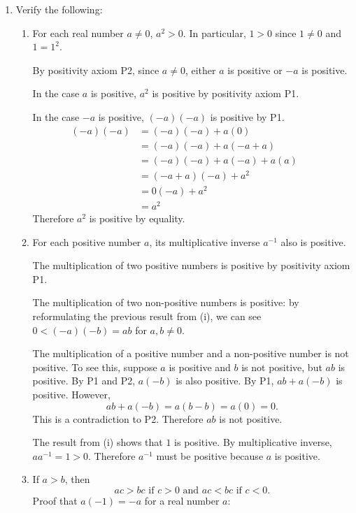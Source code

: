 \begin{enumerate}
	\item Verify the following:
	\begin{enumerate}[label=(\roman*),align=left]
        \item For each real number $a\neq 0$, $a^2>0$. In particular, $1>0$ since $1 \neq 0$ and $1=1^2$.\par
        By positivity axiom P2, since $a\neq 0$, either $a$ is positive or $-a$ is positive.\par
		In the case $a$ is positive, $a^2$ is positive by positivity axiom P1.\par
		In the case $-a$ is positive, $(-a)(-a)$ is positive by P1.
		\begin{align*}
			(-a)(-a) & = (-a)(-a) + a(0) && \tag*{by additive identity}\\
			& = (-a)(-a) + a(-a+a) && \tag*{by additive inverse}\\
			& = (-a)(-a) + a(-a) + a(a) && \tag*{by distributive property} \\
			& = (-a + a)(-a) + a^2 && \tag*{by distributive property} \\
			& = 0(-a) + a^2 &&\tag*{by additive inverse} \\
			& = a^2 &&\tag*{by additive identity}
		\end{align*}
		Therefore $a^2$ is positive by equality.
        \item For each positive number $a$, its multiplicative inverse  $a^{-1}$ also is positive.\par
        The multiplication of two positive numbers is positive by positivity axiom P1.\par
		The multiplication of two non-positive numbers is positive: by reformulating the previous result from (i), we can see $0 < (-a)(-b) = ab$ for $a,b \neq 0$. \par
		The multiplication of a positive number and a non-positive number is not positive. 
		To see this, suppose $a$ is positive and $b$ is not positive, but $ab$ is positive. By P1 and P2, $a(-b)$ is also positive.
		By P1, $ab + a(-b)$ is positive. However,
		\[
		ab + a(-b) = a(b-b) = a(0) = 0.
		\]
		This is a contradiction to P2. Therefore $ab$ is not positive.
		\par
		The result from (i) shows that $1$ is positive. By multiplicative inverse, $aa^{-1} = 1 > 0$. Therefore $a^{-1}$ must be positive because $a$ is positive.
        \item If $a>b$, then \[ ac >bc \text{ if } c>0 \text{ and } ac < bc \text{ if } c<0. \]
        Proof that $a(-1)=-a$ for a real number $a$:

\end{enumerate}
\end{enumerate}
